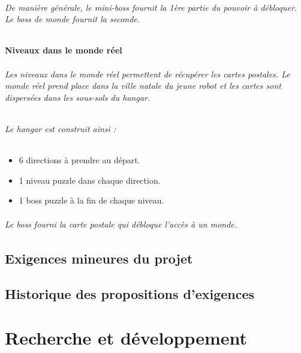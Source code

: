 \documentclass{report}
\begin{document}
\paragraph{De mani\`{e}re g\'{e}n\'{e}rale, le mini-boss fournit la 1\`{e}re partie du pouvoir à d\'{e}bloquer. Le boss de monde fournit la seconde.}

				\subsection{Niveaux dans le monde r\'{e}el}

\paragraph{Les niveaux dans le monde r\'{e}el permettent de r\'{e}cup\'{e}rer les cartes postales. Le monde r\'{e}el prend place dans la ville natale du jeune robot et les cartes sont dispers\'{e}es dans les sous-sols du hangar.}

\paragraph{Le hangar est construit ainsi :}

\begin{itemize}
\item 6 directions à prendre au d\'{e}part.
\item 1 niveau puzzle dans chaque direction.
\item 1 boss puzzle à la fin de chaque niveau.
\end{itemize}

\paragraph{Le boss fourni la carte postale qui d\'{e}bloque l’acc\`{e}s à un monde.}

		\chapter{Exigences mineures du projet}
		\chapter{Historique des propositions d'exigences}


	\part{Recherche et d\'{e}veloppement}
	\setcounter{chapter}{0}
\end{document}
